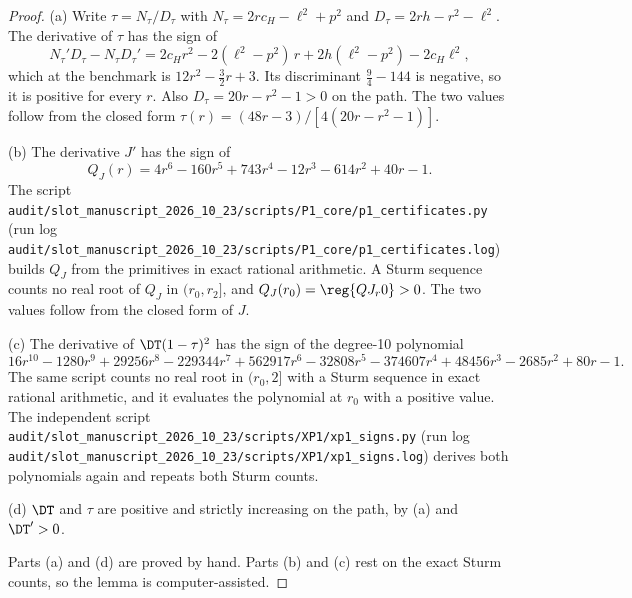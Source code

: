 \begin{proof}
(a) Write \(\tau=N_\tau/D_\tau\) with \(N_\tau=2rc_H-\ell^2+p^2\) and \(D_\tau=2rh-r^2-\ell^2\). The derivative
of \(\tau\) has the sign of
\[
N_\tau'D_\tau-N_\tau D_\tau'=2c_Hr^2-2(\ell^2-p^2)\,r+2h(\ell^2-p^2)-2c_H\ell^2 ,
\]
which at the benchmark is \(12r^2-\tfrac32r+3\). Its discriminant \(\tfrac94-144\) is negative, so it is positive
for every \(r\). Also \(D_\tau=20r-r^2-1>0\) on the path. The two values follow from the closed form
\(\tau(r)=(48r-3)/[4(20r-r^2-1)]\).

(b) The derivative \(J'\) has the sign of
\[
Q_J(r)=4r^6-160r^5+743r^4-12r^3-614r^2+40r-1 .
\]
The script \nolinkurl{audit/slot_manuscript_2026_10_23/scripts/P1_core/p1_certificates.py} (run log
\nolinkurl{audit/slot_manuscript_2026_10_23/scripts/P1_core/p1_certificates.log}) builds \(Q_J\) from the
primitives in exact rational arithmetic. A Sturm sequence counts no real root of \(Q_J\) in \((r_0,r_2]\), and
\(Q_J(r_0)=\reg{QJ_r0}>0\). The two values follow from the closed form of \(J\).

(c) The derivative of \(\DT(1-\tau)^2\) has the sign of the degree-10 polynomial
\[
16r^{10}-1280r^9+29256r^8-229344r^7+562917r^6-32808r^5-374607r^4+48456r^3-2685r^2+80r-1 .
\]
The same script counts no real root in \((r_0,2]\) with a Sturm sequence in exact rational arithmetic, and it
evaluates the polynomial at \(r_0\) with a positive value. The independent script
\nolinkurl{audit/slot_manuscript_2026_10_23/scripts/XP1/xp1_signs.py} (run log
\nolinkurl{audit/slot_manuscript_2026_10_23/scripts/XP1/xp1_signs.log}) derives both polynomials again and repeats
both Sturm counts.

(d) \(\DT\) and \(\tau\) are positive and strictly increasing on the path, by (a) and \(\DT'>0\).

Parts (a) and (d) are proved by hand. Parts (b) and (c) rest on the exact Sturm counts, so the lemma is
computer-assisted.
\end{proof}

